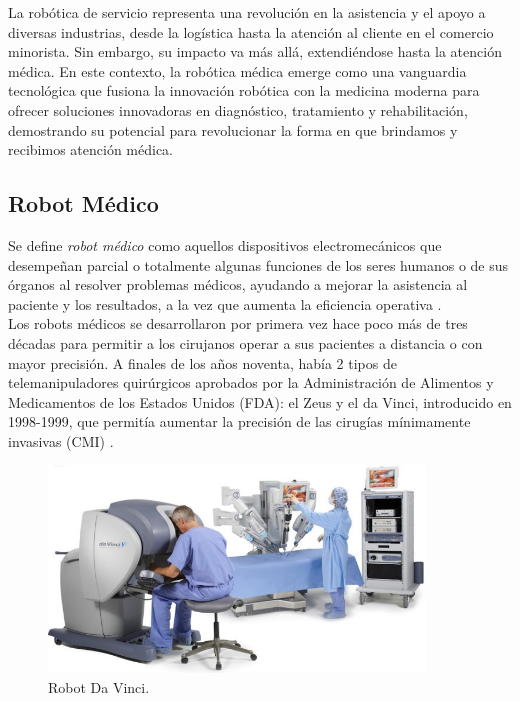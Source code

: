 La robótica de servicio representa una revolución en la asistencia y el apoyo a diversas industrias, desde la logística hasta la atención al cliente en el comercio minorista. Sin embargo, su impacto va más allá, extendiéndose hasta la atención médica. En este contexto, la robótica médica emerge como una vanguardia tecnológica que fusiona la innovación robótica con la medicina moderna para ofrecer soluciones innovadoras en diagnóstico, tratamiento y rehabilitación, demostrando su potencial para revolucionar la forma en que brindamos y recibimos atención médica.

\pagebreak
 
\subsection{Robot Médico}
\label{sec:robotica_industrial} 

Se define \textit{robot médico} como aquellos dispositivos electromecánicos que desempeñan parcial o totalmente algunas funciones de los seres humanos o de sus órganos al resolver problemas médicos, ayudando a mejorar la asistencia al paciente y los resultados, a la vez que aumenta la eficiencia operativa \cite{Kraevsky10}.\\

Los robots médicos se desarrollaron por primera vez hace poco más de tres décadas para permitir a los cirujanos operar a sus pacientes a distancia o con mayor precisión. A finales de los años noventa, había 2 tipos de telemanipuladores quirúrgicos aprobados por la Administración de Alimentos y Medicamentos de los Estados Unidos (FDA): el Zeus y el da Vinci, introducido en 1998-1999, que permitía aumentar la precisión de las cirugías mínimamente invasivas (CMI) \cite{Romero20}.\\

\begin{figure} [h!]
    \begin{center}
      \includegraphics[width=10cm]{figs/Robot Da Vinci.png}
    \end{center}
    \caption{Robot Da Vinci.}
    \label{fig:RobotDaVinci}
\end{figure}

